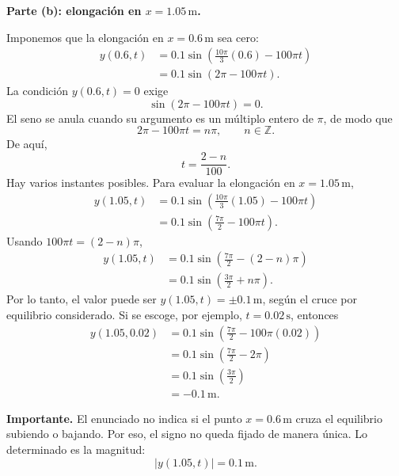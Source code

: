 \documentclass[11pt]{article}
\newcommand{\importante}[1]{%
  \par\medskip
  \noindent\textbf{Importante.} #1\par
}
\newcommand{\paso}[1]{%
  \par\medskip
  \noindent\textbf{#1}\par
  \vspace{0.1em}%
}
\begin{document}
\paso{Parte (b): elongaci\'on en $x=1.05\,\mathrm{m}$.}
Imponemos que la elongaci\'on en $x=0.6\,\mathrm{m}$ sea cero:
\begin{align*}
    y(0.6,t)
    &=0.1\sin\left(\frac{10\pi}{3}(0.6)-100\pi t\right)\\
    &=0.1\sin(2\pi-100\pi t).
\end{align*}
La condici\'on $y(0.6,t)=0$ exige
\begin{equation*}
    \sin(2\pi-100\pi t)=0.
\end{equation*}
El seno se anula cuando su argumento es un m\'ultiplo entero de $\pi$, de modo que
\begin{equation*}
    2\pi-100\pi t=n\pi,
    \qquad n\in\mathbb{Z}.
\end{equation*}
De aqu\'i,
\begin{equation*}
    t=\frac{2-n}{100}.
\end{equation*}
Hay varios instantes posibles. Para evaluar la elongaci\'on en $x=1.05\,\mathrm{m}$,
\begin{align*}
    y(1.05,t)
    &=0.1\sin\left(\frac{10\pi}{3}(1.05)-100\pi t\right)\\
    &=0.1\sin\left(\frac{7\pi}{2}-100\pi t\right).
\end{align*}
Usando $100\pi t=(2-n)\pi$,
\begin{align*}
    y(1.05,t)
    &=0.1\sin\left(\frac{7\pi}{2}-(2-n)\pi\right)\\
    &=0.1\sin\left(\frac{3\pi}{2}+n\pi\right).
\end{align*}
Por lo tanto, el valor puede ser $y(1.05,t)=\pm0.1\,\mathrm{m}$, seg\'un el cruce por equilibrio considerado. Si se escoge, por ejemplo, $t=0.02\,\mathrm{s}$, entonces
\begin{align*}
    y(1.05,0.02)
    &=0.1\sin\left(\frac{7\pi}{2}-100\pi(0.02)\right)\\
    &=0.1\sin\left(\frac{7\pi}{2}-2\pi\right)\\
    &=0.1\sin\left(\frac{3\pi}{2}\right)\\
    &=-0.1\,\mathrm{m}.
\end{align*}

\importante{El enunciado no indica si el punto $x=0.6\,\mathrm{m}$ cruza el equilibrio subiendo o bajando. Por eso, el signo no queda fijado de manera \'unica. Lo determinado es la magnitud:
\begin{equation*}
    \boxed{|y(1.05,t)|=0.1\,\mathrm{m}}.
\end{equation*}}

\clearpage
\end{document}
